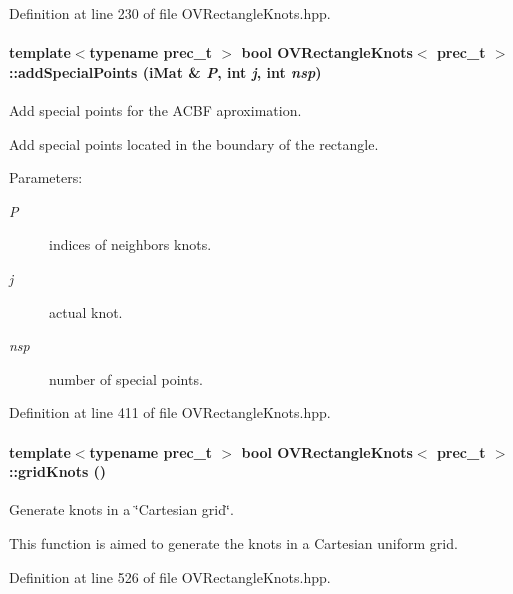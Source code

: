 Definition at line 230 of file OVRectangleKnots.hpp.\hypertarget{classOVRectangleKnots_6e4e215757508de77c9d915269a174b9}{
\paragraph[{addSpecialPoints}]{\setlength{\rightskip}{0pt plus 5cm}template$<$typename prec\_\-t $>$ bool {\bf OVRectangleKnots}$<$ prec\_\-t $>$::addSpecialPoints ({\bf iMat} \& {\em P}, \/  int {\em j}, \/  int {\em nsp})}\hfill}
\label{classOVRectangleKnots_6e4e215757508de77c9d915269a174b9}


Add special points for the ACBF aproximation. 

Add special points located in the boundary of the rectangle.

\begin{Desc}
\item[Parameters:]
\begin{description}
\item[{\em P}]indices of neighbors knots. \item[{\em j}]actual knot. \item[{\em nsp}]number of special points. \end{description}
\end{Desc}


Definition at line 411 of file OVRectangleKnots.hpp.\hypertarget{classOVRectangleKnots_202185a7b2c2aba07205bdd996e572c2}{
\paragraph[{gridKnots}]{\setlength{\rightskip}{0pt plus 5cm}template$<$typename prec\_\-t $>$ bool {\bf OVRectangleKnots}$<$ prec\_\-t $>$::gridKnots ()}\hfill}
\label{classOVRectangleKnots_202185a7b2c2aba07205bdd996e572c2}


Generate knots in a \char`\"{}Cartesian grid\char`\"{}. 

This function is aimed to generate the knots in a Cartesian uniform grid. 

Definition at line 526 of file OVRectangleKnots.hpp.